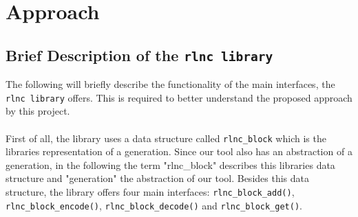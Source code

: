 \documentclass[a4paper,english,10pt]{tumarticle}
\begin{document}
\section{Approach}\label{app}

\subsection{Brief Description of the \texttt{rlnc library}}\label{app:desc}
The following will briefly describe the functionality of the main interfaces, the \texttt{rlnc library} offers.
This is required to better understand the proposed approach by this project.
\\\\
First of all, the library uses a data structure called \texttt{rlnc\_block} which is the libraries representation of a generation.
Since our tool also has an abstraction of a generation, in the following the term "rlnc\_block" describes this libraries data structure and 
"generation" the abstraction of our tool. Besides this data structure, the library offers four main interfaces: 
\texttt{rlnc\_block\_add()}, \texttt{rlnc\_block\_encode()}, \texttt{rlnc\_block\_decode()} and \texttt{rlnc\_block\_get()}.
\end{document}
